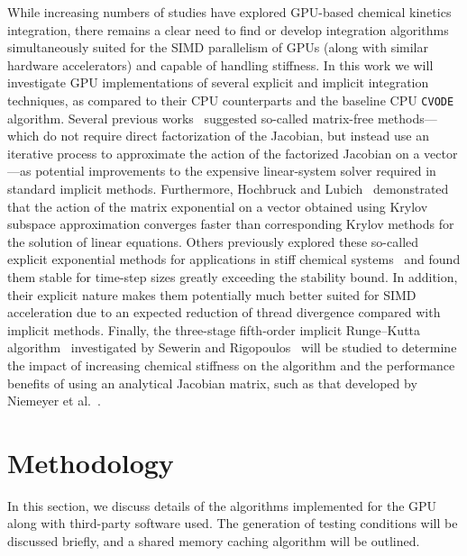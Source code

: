 \documentclass[final,twocolumn]{elsarticle}
\begin{document}
While increasing numbers of studies have explored GPU-based chemical kinetics integration, there remains a clear need to find or develop integration algorithms simultaneously suited for the SIMD parallelism of GPUs (along with similar hardware accelerators) and capable of handling stiffness.
In this work we will investigate GPU implementations of several explicit and implicit integration techniques, as compared to their CPU counterparts and the baseline CPU \texttt{CVODE}~\cite{Hindmarsh:2005hg} algorithm.
Several previous works~\cite{Perini20141180,McNenly2015581} suggested so-called matrix-free methods---which do not require direct factorization of the Jacobian, but instead use an iterative process to approximate the action of the factorized Jacobian on a vector---as potential improvements to the expensive linear-system solver required in standard implicit methods.
Furthermore, Hochbruck and Lubich~\cite{Hochbruck:1997} demonstrated that the action of the matrix exponential on a vector obtained using Krylov subspace approximation converges faster than corresponding Krylov methods for the solution of linear equations.
Others previously explored these so-called explicit exponential methods for applications in stiff chemical systems~\cite{Bisetti:2012jw,falati2011integration} and found them stable for time-step sizes greatly exceeding the stability bound.
In addition, their explicit nature makes them potentially much better suited for SIMD acceleration due to an expected reduction of thread divergence compared with implicit methods.
Finally, the three-stage fifth-order implicit Runge--Kutta algorithm~\cite{wanner1991solving} investigated by Sewerin and Rigopoulos~\cite{Sewerin20151375} will be studied to determine the impact of increasing chemical stiffness on the algorithm and the performance benefits of using an analytical Jacobian matrix, such as that developed by Niemeyer et al.~\cite{Niemeyer:2015im,Niemeyer:2015ws}.

\section{Methodology}
\label{sec:Method}
\ifmeasure
\addvspace{10pt}
\fi

In this section, we discuss details of the algorithms implemented for the GPU along with third-party software used.
The generation of testing conditions will be discussed briefly, and a shared memory caching algorithm will be outlined.
\end{document}

